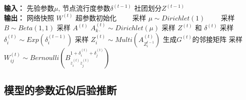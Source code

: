 
\begin{algorithm}[H]
\caption{$t \ge 2$的网络快照的生成过程}\label{gent2}
\begin{algorithmic}[1]
\STATE \textbf{输入：} 先验参数$\mu$, 节点流行度参数$\delta^{(t-1)}$ 社团划分$Z^{(t-1)}$ \\
\STATE \textbf{输出：} 网络快照 $W^{(t)}$
\STATE 超参数初始化
\STATE ~~~~采样 $\mu \sim Dirichlet (1)$ 
\STATE ~~~~采样 $B \sim Beta(1,1)$
\STATE 采样 $A^{(t)}$
\STATE $A^{(t)}_{k\cdot} \sim Dirichlet(\mu)$
\ENDFOR
\STATE 采样 $Z^{(t)}$ 和 $\delta^{(t)}$
\STATE 采样 $\delta^{(t)}_i \sim Exp(\delta^{(t-1)}_i)$
\STATE 采样 $Z^{(t)}_i \sim Multi(A^{(t)}_{Z_i^{t-1}})$
\ENDFOR
\STATE 生成$G^{(t)}的邻接矩阵$
\STATE 采样 $W^{(t)}_{ij} \sim Bernoulli(B_{z_i^{(t)} z_j^{(t)}}^{1+\delta_i^{(t)} + \delta_j^{(t)}})$
\ENDFOR
\end{algorithmic}
\end{algorithm}

\subsection{模型的参数近似后验推断}



